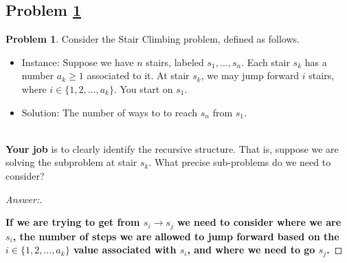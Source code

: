 \documentclass[11pt]{article}
\theoremstyle{definition}
\theoremstyle{definition}
\newtheorem{required}{Problem}
\theoremstyle{definition}
\begin{document}
\subsection{Problem \ref{DP1}}
\begin{required} \label{DP1}
Consider the \textsf{Stair Climbing} problem, defined as follows.
\begin{itemize}
\item \textsf{Instance:} Suppose we have $n$ stairs, labeled $s_{1}, \ldots, s_{n}$. Each stair $s_{k}$ has a number $a_{k} \geq 1$ associated to it. At stair $s_{k}$, we may jump forward $i$ stairs, where $i \in \{ 1, 2, \ldots, a_{k}\}$. You start on $s_{1}$.

\item \textsf{Solution:} The number of ways to to reach $s_{n}$ from $s_{1}$.
\end{itemize}

\noindent \\ \textbf{Your job} is to clearly identify the recursive structure. That is, suppose we are solving the subproblem at stair $s_{k}$. What precise sub-problems do we need to consider?
\end{required}

\begin{proof}[Answer:] \
\item \textbf{If we are trying to get from $s_i \to s_j$ we need to consider where we are $s_i$, the number of steps we are allowed to jump forward based on the $i \in \{ 1, 2, \ldots, a_{k}\}$ value associated with $s_i$, and where we need to go $s_j$.}

\end{proof}



\newpage
\end{document}
